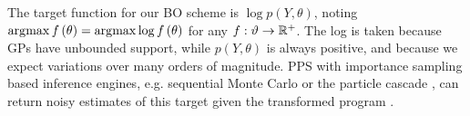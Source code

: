
The target function for our BO scheme is $\log p(Y,\theta)$, noting $\operatorname*{arg\,\!max} f\left(\theta\right) = \operatorname*{arg\,\!max} \log f\left(\theta\right)$ for any $f : \vartheta \rightarrow \mathbb{R}^+$.  The log is taken because GPs have unbounded support, while $p\left(Y,\theta\right)$ is always positive, and because we expect variations over many orders of magnitude.  PPS with importance sampling based inference engines, e.g. sequential Monte Carlo \citep{wood2014new} or the particle cascade \citep{paige2014asynchronous}, can return noisy estimates of this target given the transformed program \qmarg.   



